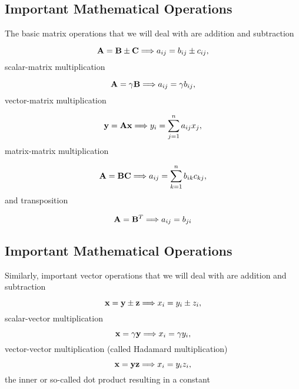 \documentclass[%
twoside,                 %
final,                   %
10pt]{article}
\begin{document}
\subsection{Important Mathematical Operations}

The basic matrix operations that we will deal with are addition and subtraction

\begin{equation}
{\bf A}= {\bf B}\pm{\bf C}  \Longrightarrow a_{ij} = b_{ij}\pm c_{ij},
\label{eq:mtxadd}
\end{equation}
scalar-matrix multiplication

\begin{equation}
{\bf A}= \gamma{\bf B}  \Longrightarrow a_{ij} = \gamma b_{ij},
\end{equation}
vector-matrix multiplication

\begin{equation}
{\bf y}={\bf Ax}   \Longrightarrow y_{i} = \sum_{j=1}^{n} a_{ij}x_j,
\label{eq:vecmtx}
\end{equation}
matrix-matrix multiplication

\begin{equation}
{\bf A}={\bf BC}   \Longrightarrow a_{ij} = \sum_{k=1}^{n} b_{ik}c_{kj},
\label{eq:mtxmtx}
\end{equation}
and transposition

\begin{equation}
{\bf A}={\bf B}^T   \Longrightarrow a_{ij} = b_{ji}
\end{equation}

\subsection{Important Mathematical Operations}

Similarly, important vector operations that we will deal with are addition and subtraction

\begin{equation}
{\bf x}= {\bf y}\pm{\bf z}  \Longrightarrow x_{i} = y_{i}\pm z_{i},
\end{equation}
scalar-vector multiplication

\begin{equation}
{\bf x}= \gamma{\bf y}  \Longrightarrow x_{i} = \gamma y_{i},
\end{equation}
vector-vector multiplication (called Hadamard multiplication)

\begin{equation}
{\bf x}={\bf yz}   \Longrightarrow x_{i} = y_{i}z_i,
\end{equation}
the inner or so-called dot product  resulting in a constant
\end{document}
